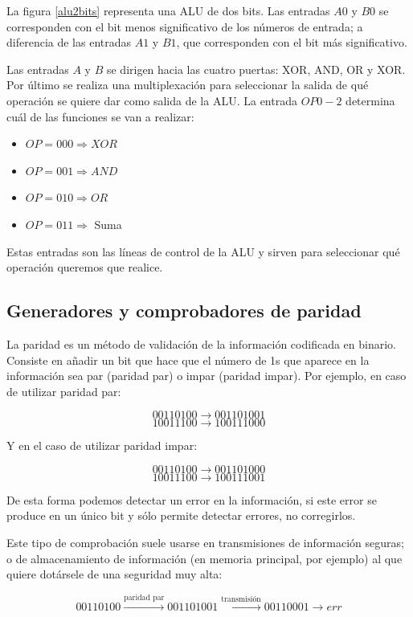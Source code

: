 \documentclass[a4paper, 11pt, titlepage]{article}
\begin{document}
		La figura \ref{alu2bits} representa una ALU de dos bits. Las entradas $A0$ y $B0$ se corresponden 
		con el bit menos significativo de los números de entrada; a diferencia de las entradas $A1$ y $B1$, 
		que corresponden con el bit más significativo.

		Las entradas $A$ y $B$ se dirigen hacia las cuatro puertas: XOR, AND, OR y XOR. Por último se realiza 
		una multiplexación para seleccionar la salida de qué operación se quiere dar como salida de la ALU. 
		La entrada $OP0-2$ determina cuál de las funciones se van a realizar:

		\begin{itemize}
			\item $OP = 000 \Rightarrow XOR$
			\item $OP = 001 \Rightarrow AND$
			\item $OP = 010 \Rightarrow OR$
			\item $OP = 011 \Rightarrow $ Suma
		\end{itemize}
  
		Estas entradas son las líneas de control de la ALU y sirven para seleccionar qué operación queremos que 
		realice.

	\subsection{Generadores y comprobadores de paridad}

		La paridad es un método de validación de la información codificada en binario. Consiste en añadir 
		un bit que hace que el número de 1s que aparece en la información sea par (paridad par) o impar 
		(paridad impar). Por ejemplo, en caso de utilizar paridad par:

		\[00110100 \rightarrow 001101001\]
		\[10011100 \rightarrow 100111000\]

		Y en el caso de utilizar paridad impar:

		\[00110100 \rightarrow 001101000\]
		\[10011100 \rightarrow 100111001\]

		De esta forma podemos detectar un error en la información, si este error se produce en un único bit y 
		sólo permite detectar errores, no corregirlos.

		Este tipo de comprobación suele usarse en transmisiones de información seguras; o de almacenamiento de 
		información (en memoria principal, por ejemplo) al que quiere dotársele de una seguridad muy alta:

		\[00110100 \xrightarrow[]{\text{paridad par}} 001101001 \xrightarrow[]{\text{transmisión}} 00110001 \rightarrow err\] 
\end{document}

